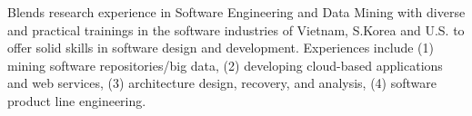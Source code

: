 


\begin{cvparagraph}
	
	Blends research experience in Software Engineering and Data Mining with diverse and practical trainings in the software industries of Vietnam, S.Korea and U.S. to offer solid skills in software design and development. Experiences include (1) mining software repositories/big data, (2) developing cloud-based applications and web services, (3) architecture design, recovery, and analysis, (4) software product line engineering. %
	
\end{cvparagraph}
